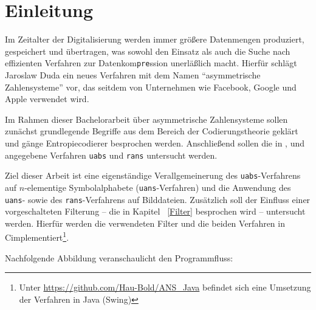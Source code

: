 \documentclass[a4paper,12pt]{article}
\newcommand{\CC}{C\nolinebreak\hspace{-.05em}\raisebox{.4ex}{\tiny\bf+}\nolinebreak\hspace{-.10em}\raisebox{.4ex}{\tiny\bf+}\;}
\begin{document}
\newpage
\tableofcontents
\pagebreak
\section{Einleitung}
Im Zeitalter der Digitalisierung werden immer größere Datenmengen produziert, gespeichert und übertragen, was sowohl den Einsatz als auch die Suche nach effizienten Verfahren zur Datenkom{\tt{pre}}ssion unerläßlich macht.
Hierfür schlägt Jaroslaw Duda\cite{Duda} ein neues Verfahren mit dem Namen "`asymmetrische Zahlensysteme"' vor, das seitdem von Unternehmen wie Facebook\cite{fb}, Google\cite{google} und Apple\cite{apple} verwendet wird. 
\par
Im Rahmen dieser Bachelorarbeit über asymmetrische Zahlensysteme sollen zunächst grundlegende Begriffe aus dem Bereich der Codierungstheorie geklärt und gänge Entropiecodierer besprochen werden.
Anschließend sollen die in \cite{Giesen}, \cite{Duda} und \cite{Krajcevski} angegebene Verfahren {\tt{uabs}} und {\tt{rans}} untersucht werden.
\par
\vspace{0.5cm}
Ziel dieser Arbeit ist eine eigenständige Verallgemeinerung des {\tt{uabs}}-Verfahrens auf $n$-elementige Symbolalphabete ({\tt{uans}}-Verfahren) und die Anwendung des  {\tt{uans}}- sowie des {\tt{rans}}-Verfahrens auf Bilddateien. Zusätzlich soll der Einfluss einer vorgeschalteten Filterung -- die in Kapitel ~\ref{Filter} besprochen wird -- untersucht werden. Hierfür werden die verwendeten Filter und die beiden Verfahren in \CC implementiert\footnote{Unter \url{https://github.com/Hau-Bold/ANS_Java} befindet sich eine Umsetzung der Verfahren in Java (Swing)}. 
\par
\vspace{0.5cm}
Nachfolgende Abbildung veranschaulicht den Programmfluss:
\end{document}
